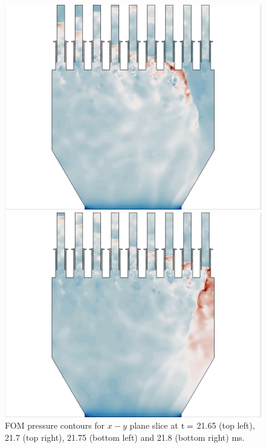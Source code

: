 \begin{figure}
	\begin{minipage}{0.49\linewidth}
		\includegraphics[width=0.99\linewidth,trim={0.5em 0em 6cm 0em},clip]{Chapters/HPROMResults/Images/nineElem/example_snaps/example_pressure_z_217500.png}
	\end{minipage}
	\begin{minipage}{0.49\linewidth}
		\includegraphics[width=0.99\linewidth,trim={6cm 0em 0.5em 0em},clip]{Chapters/HPROMResults/Images/nineElem/example_snaps/example_pressure_z_218000.png}
	\end{minipage}
	\caption{\label{fig:nineElemFOMPressure}FOM pressure contours for $x-y$ plane slice at $\text{t} = $ 21.65 (top left), 21.7 (top right), 21.75 (bottom left) and 21.8 (bottom right) ms.}
\end{figure}

